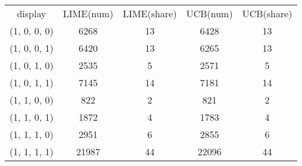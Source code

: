 \begin{tabular}{ccccc}
display & LIME(num) & LIME(share) & UCB(num) & UCB(share)\\
(1, 0, 0, 0) & 6268 & 13 & 6428 & 13\\
(1, 0, 0, 1) & 6420 & 13 & 6265 & 13\\
(1, 0, 1, 0) & 2535 & 5 & 2571 & 5\\
(1, 0, 1, 1) & 7145 & 14 & 7181 & 14\\
(1, 1, 0, 0) & 822 & 2 & 821 & 2\\
(1, 1, 0, 1) & 1872 & 4 & 1783 & 4\\
(1, 1, 1, 0) & 2951 & 6 & 2855 & 6\\
(1, 1, 1, 1) & 21987 & 44 & 22096 & 44\\
\end{tabular}
